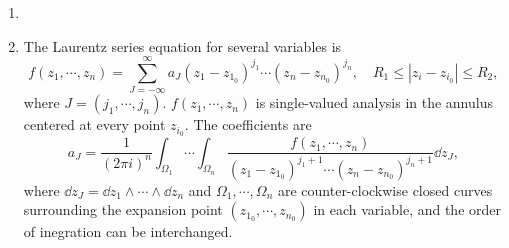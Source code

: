 \documentclass[lang=en,12pt]{beautybook}
\begin{document}
\begin{solution}
    \begin{enumerate}
        \item 
        \item The Laurentz series equation for several variables is 
        \[
            f(z_1,\cdots,z_n)=\sum_{J=-\infty}^{\infty} a_J (z_1-z_{1_0})^{j_1} \cdots (z_n-z_{n_0})^{j_n},\quad R_1\leqslant |z_i-z_{i_0}|\leqslant R_2,
        \]
        where $J=(j_1,\cdots,j_n)$.  $f(z_1,\cdots,z_n)$ is single-valued analysis in the annulus centered at every point $z_{i_0}$. The coefficients are
        \[
            a_J=\frac{1}{(2\pi i)^n} \int_{\Omega_1}\cdots \int_{\Omega_n} \frac{f(z_1,\cdots,z_n)}{(z_1-z_{1_0})^{j_1+1} \cdots (z_n-z_{n_0})^{j_n+1}}\dd z_J,
        \]
        where $\dd z_J=\dd z_1\wedge\cdots \wedge\dd z_n$ and $\Omega_1,\cdots,\Omega_n$ are counter-clockwise closed curves surrounding the expansion point $(z_{1_0},\cdots,z_{n_0})$ in each variable, and the order of inegration can be interchanged.


\end{enumerate}
\end{solution}
\end{document}

